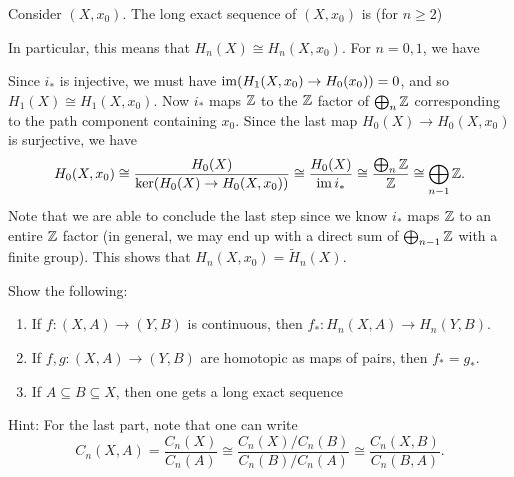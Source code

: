 \begin{example}
  Consider $(X, x_0)$. The long exact sequence of
  $(X, x_0)$ is (for $n \ge 2$)
  \begin{center}
  \end{center}
  In particular, this means that
  $H_n(X) \cong H_n(X, x_0)$. For $n = 0, 1$, we have
  \begin{center}
  \end{center}
  Since $i_*$ is injective, we must have
  $\operatorname{im}(H_1(X, x_0) \to H_0(x_0)) = 0$, and
  so $H_1(X) \cong H_1(X, x_0)$. Now $i_*$ maps
  $\mathbb{Z}$ to the $\mathbb{Z}$ factor of $\bigoplus_n \mathbb{Z}$
  corresponding to the path component containing
  $x_0$. Since the last map $H_0(X) \to H_0(X, x_0)$
  is surjective, we have
  \[
    H_0(X, x_0)
    \cong \frac{H_0(X)}{\ker(H_0(X) \to H_0(X, x_0))}
    \cong \frac{H_0(X)}{\operatorname{im} i_*}
    \cong \frac{\bigoplus_n \mathbb{Z}}{\mathbb{Z}}
    \cong \bigoplus_{n - 1} \mathbb{Z}.
  \]
  Note that we are able to conclude the last step
  since we know $i_*$ maps $\mathbb{Z}$ to an entire $\mathbb{Z}$
  factor (in general, we may end up with a direct sum
  of $\bigoplus_{n - 1} \mathbb{Z}$ with a finite group).
  This shows that $H_n(X, x_0) = \widetilde{H}_n(X)$.
\end{example}

\begin{exercise}
  Show the following:
  \begin{enumerate}
    \item If $f : (X, A) \to (Y, B)$ is continuous,
      then $f_* : H_n(X, A) \to H_n(Y, B)$.
    \item If $f, g : (X, A) \to (Y, B)$ are homotopic
      as maps of pairs, then $f_* = g_*$.
    \item If $A \subseteq B \subseteq X$, then one
      gets a long exact sequence
      \begin{center}
      \end{center}
  \end{enumerate}
  Hint: For the last part, note that one can write
  \[
    C_n(X, A)
    = \frac{C_n(X)}{C_n(A)}
    \cong \frac{C_n(X) / C_n(B)}{C_n(B) / C_n(A)}
    \cong \frac{C_n(X, B)}{C_n(B, A)}.
  \]
\end{exercise}

